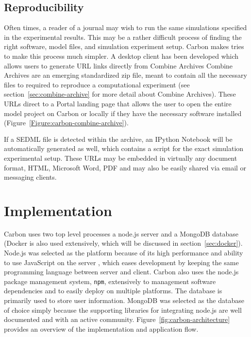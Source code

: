 \subsection{Reproducibility}

Often times, a reader of a journal may wish to run the same simulations specified in the experimental results.
This may be a rather difficult process of finding the right software, model files, and simulation experiment setup.
Carbon makes tries to make this process much simpler.
A desktop client has been developed which allows users to generate URL links directly from Combine Archives \autocite{combine2014archive}
Combine Archives are an emerging standardized zip file, meant to contain all the necessary files to required to reproduce a computational experiment (see section~\ref{sec:combine-archive} for more detail about Combine Archives).
These URLs direct to a Portal landing page that allows the user to open the entire model project on Carbon or locally if they have the necessary software installed (Figure~\ref{Figure:carbon-combine-archive}).

If a SEDML file is detected within the archive, an IPython Notebook will be automatically generated as well, which contains a script for the exact simulation experimental setup.
These URLs may be embedded in virtually any document format, HTML, Microsoft Word, PDF and may also be easily shared via email or messaging clients.

\section{Implementation}

Carbon uses two top level processes a node.js server and a MongoDB database (Docker is also used extensively, which will be discussed in section~\ref{sec:docker}).
Node.js was selected as the platform because of its high performance and ability to use JavaScript on the server \autocite{tilkov2010node}, which eases development by keeping the same programming language between server and client.
Carbon also uses the node.js package management system, \texttt{npm}, extensively to management software dependencies and to easily deploy on multiple platforms. \autocite{lerner2011forge}
The database is primarily used to store user information.
MongoDB was selected as the database of choice simply because the supporting libraries for integrating node.js are well documented and with an active community.
Figure~\ref{fig:carbon-architecture} provides an overview of the implementation and application flow.

